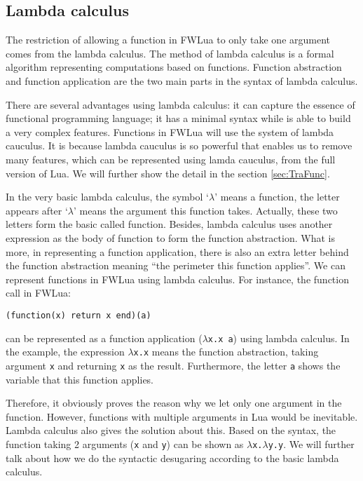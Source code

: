 \subsection{Lambda calculus}
The restriction of allowing a function in FWLua to only take one argument comes from the lambda calculus. The method of lambda calculus is a formal algorithm representing computations based on functions. Function abstraction and function application are the two main parts in the syntax of lambda calculus. 

There are several advantages using lambda calculus: it can capture the essence of functional programming language; it has a minimal syntax while is able to build a very complex features. Functions in FWLua will use the system of lambda cauculus. It is because lambda cauculus is so powerful that enables us to remove many features, which can be represented using lamda cauculus, from the full version of Lua. We will further show the detail in the section \ref{sec:TraFunc}.

In the very basic lambda calculus, the symbol `$\lambda$' means a function, the letter appears after `$\lambda$' means the argument this function takes.
Actually, these two letters form the basic called function.
Besides, lambda calculus uses another expression as the body of function to form the function abstraction. What is more, in representing a function application, there is also an extra letter behind the function abstraction meaning ``the perimeter this function applies''. We can represent functions in FWLua using lambda calculus. For instance, the function call in FWLua:

\begin{verbatim}
(function(x) return x end)(a)
\end{verbatim}
can be represented as a function application ({\tt $\lambda$x.x a}) using lambda calculus. In the example, the expression {\tt $\lambda$x.x} means the function abstraction, taking argument {\tt x} and returning {\tt x} as the result. Furthermore, the letter {\tt a} shows the variable that this function applies.

Therefore, it obviously proves the reason why we let only one argument in the function. However, functions with multiple arguments in Lua would be inevitable. Lambda calculus also gives the solution about this. Based on the syntax, the function taking 2 arguments ({\tt x} and {\tt y}) can be shown as {\tt $\lambda$x.$\lambda$y.y}. We will further talk about how we do the syntactic desugaring according to the basic lambda calculus.


